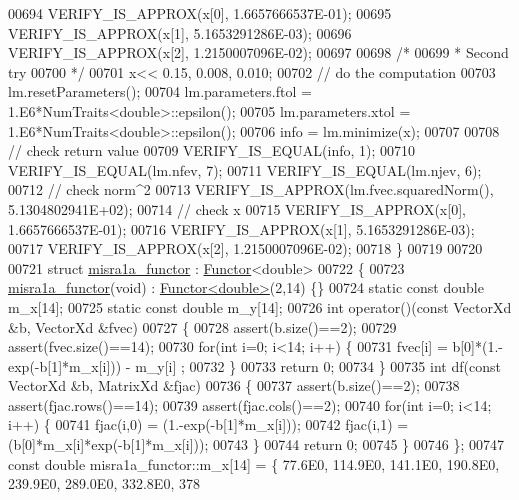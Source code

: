 \begin{DoxyCode}
00694   VERIFY\_IS\_APPROX(x[0], 1.6657666537E-01);
00695   VERIFY\_IS\_APPROX(x[1], 5.1653291286E-03);
00696   VERIFY\_IS\_APPROX(x[2], 1.2150007096E-02);
00697 
00698   \textcolor{comment}{/*}
00699 \textcolor{comment}{   * Second try}
00700 \textcolor{comment}{   */}
00701   x<< 0.15, 0.008, 0.010;
00702   \textcolor{comment}{// do the computation}
00703   lm.resetParameters();
00704   lm.parameters.ftol = 1.E6*NumTraits<double>::epsilon();
00705   lm.parameters.xtol = 1.E6*NumTraits<double>::epsilon();
00706   info = lm.minimize(x);
00707 
00708   \textcolor{comment}{// check return value}
00709   VERIFY\_IS\_EQUAL(info, 1);
00710   VERIFY\_IS\_EQUAL(lm.nfev, 7);
00711   VERIFY\_IS\_EQUAL(lm.njev, 6);
00712   \textcolor{comment}{// check norm^2}
00713   VERIFY\_IS\_APPROX(lm.fvec.squaredNorm(), 5.1304802941E+02);
00714   \textcolor{comment}{// check x}
00715   VERIFY\_IS\_APPROX(x[0], 1.6657666537E-01);
00716   VERIFY\_IS\_APPROX(x[1], 5.1653291286E-03);
00717   VERIFY\_IS\_APPROX(x[2], 1.2150007096E-02);
00718 \}
00719 
00720 
00721 \textcolor{keyword}{struct }\hyperlink{structmisra1a__functor}{misra1a\_functor} : \hyperlink{struct_functor}{Functor}<double>
00722 \{
00723     \hyperlink{structmisra1a__functor}{misra1a\_functor}(\textcolor{keywordtype}{void}) : \hyperlink{struct_functor}{Functor<double>}(2,14) \{\}
00724     \textcolor{keyword}{static} \textcolor{keyword}{const} \textcolor{keywordtype}{double} m\_x[14];
00725     \textcolor{keyword}{static} \textcolor{keyword}{const} \textcolor{keywordtype}{double} m\_y[14];
00726     \textcolor{keywordtype}{int} operator()(\textcolor{keyword}{const} VectorXd &b, VectorXd &fvec)
00727     \{
00728         assert(b.size()==2);
00729         assert(fvec.size()==14);
00730         \textcolor{keywordflow}{for}(\textcolor{keywordtype}{int} i=0; i<14; i++) \{
00731             fvec[i] = b[0]*(1.-exp(-b[1]*m\_x[i])) - m\_y[i] ;
00732         \}
00733         \textcolor{keywordflow}{return} 0;
00734     \}
00735     \textcolor{keywordtype}{int} df(\textcolor{keyword}{const} VectorXd &b, MatrixXd &fjac)
00736     \{
00737         assert(b.size()==2);
00738         assert(fjac.rows()==14);
00739         assert(fjac.cols()==2);
00740         \textcolor{keywordflow}{for}(\textcolor{keywordtype}{int} i=0; i<14; i++) \{
00741             fjac(i,0) = (1.-exp(-b[1]*m\_x[i]));
00742             fjac(i,1) = (b[0]*m\_x[i]*exp(-b[1]*m\_x[i]));
00743         \}
00744         \textcolor{keywordflow}{return} 0;
00745     \}
00746 \};
00747 \textcolor{keyword}{const} \textcolor{keywordtype}{double} misra1a\_functor::m\_x[14] = \{ 77.6E0, 114.9E0, 141.1E0, 190.8E0, 239.9E0, 289.0E0, 332.8E0, 378

\end{DoxyCode}
